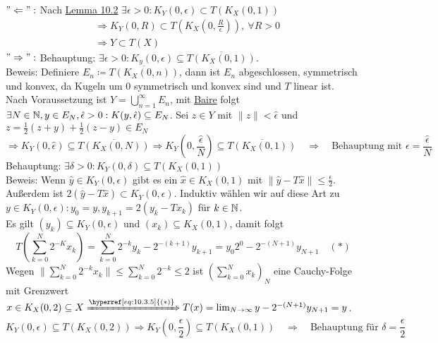 \begin{beweis}
	$"\Leftarrow":$ Nach \hyperref[lemma:10.2]{Lemma 10.2} $\exists \epsilon > 0: K_{Y}(0, \epsilon) \subset T(K_{X}(0, 1)) $
	\begin{align*}
		& \Rightarrow K_{Y}(0, R) \subset T(K_{X}(0, \frac{R}{\epsilon})), ~ \forall R > 0 \\
		& \Rightarrow Y \subset T(X)
	\end{align*}
	$"\Rightarrow":$ Behauptung: $\exists \epsilon > 0: K_{y}(0, \epsilon) \subseteq \overline{T(K_{X}(0,1))}$. \\
	Beweis: Definiere $E_{n} \coloneqq \overline{T(K_{X}(0, n))}$, dann ist $E_{n}$ abgeschlossen, symmetrisch und konvex, da Kugeln um $0$ symmetrisch und konvex sind und $T$ linear ist. \\
	Nach Voraussetzung ist $Y = \bigcup_{n = 1}^{\infty} E_{n}$, mit \hyperref[satz:9.1-baire]{Baire} folgt $\exists N \in \mathbb{N}, y \in E_{N}, \hat \epsilon > 0: K(y, \hat \epsilon) \subseteq E_{N}$. Sei $z \in Y$ mit $\| z \| < \hat \epsilon$ und $z = \frac{1}{2} (z + y) + \frac{1}{2} (z - y) \in E_{N}$
		\[ \Rightarrow K_{Y}(0, \hat \epsilon) \subseteq \overline{T(K_{X}(0, N))} \Rightarrow K_{Y}(0, \frac{\hat \epsilon}{N}) \subseteq \overline{T(K_{X}(0, 1))} \quad \Rightarrow \quad \text{Behauptung mit } \epsilon = \frac{\hat \epsilon}{N}  \]
		Behauptung: $\exists \delta > 0: K_{Y}(0, \delta) \subseteq T(K_{X}(0, 1))$ \\
		Beweis: Wenn $\hat y \in K_{Y}(0, \epsilon)$ gibt es ein $\hat x \in K_{X}(0, 1)$ mit $\| \hat y - T \hat x \| \leq \frac{\epsilon}{2}$. \\
		Au{\ss}erdem ist $2 (\hat y - T \hat x) \subset K_{Y}(0, \epsilon)$. Induktiv wählen wir auf diese Art zu $y \in K_{Y}(0, \epsilon): y_{0} = y, y_{k + 1} = 2 ( y_{k} - T x_{k})$ für $k \in \mathbb{N}$. \\
		Es gilt $(y_{k}) \subseteq K_{Y}(0, \epsilon)$ und $(x_{k}) \subseteq K_{X}(0, 1)$, damit folgt
		\[ T \left( \sum_{k = 0}^{N} 2^{-K} x_{k} \right) = \sum_{k = 0}^{N} 2^{-k} y_{k} - 2^{-(k+1)} y_{k+1} = y_{0} 2^{0} - 2^{-(N+1)} y_{N+1} \quad (*) \label{eq:10.3.5} \]
		Wegen $\| \sum_{k = 0}^{N} 2^{-k} x_{k} \| \leq \sum_{k = 0}^{N} 2^{-k} \leq 2$ ist $\left( \sum_{k = 0}^{N} x_{k} \right)_{N}$ eine Cauchy-Folge mit Grenzwert $x \in K_{X}(0, 2) \subseteq X \xRightarrow[]{\hyperref[eq:10.3.5]{(*)}} T(x) = \lim_{N \rightarrow \infty} y - 2^{-(N+1)} y_{N+1} = y$. 
		\[ K_{Y} \left( 0, \epsilon \right) \subseteq T \left( K_{X}(0, 2) \right) \Rightarrow K_{Y} \left( 0, \frac{\epsilon}{2} \right) \subseteq T \left( K_{X}(0, 1) \right) \quad \Rightarrow \quad \text{Behauptung für } \delta = \frac{\epsilon}{2} \]
\end{beweis}


